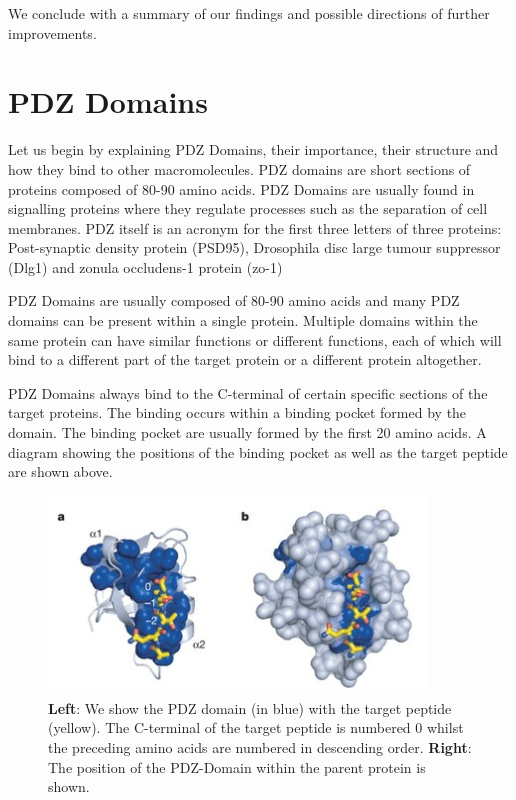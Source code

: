 \documentclass[a4paper, 12pt]{article}
\begin{document}
	We conclude with a summary of our findings and possible directions of further improvements. 

	\section{PDZ Domains}

	Let us begin by explaining PDZ Domains, their importance, their structure and how they bind to other macromolecules. PDZ domains are short sections of proteins composed of 80-90 amino acids. PDZ Domains are usually found in signalling proteins where they regulate processes such as the separation of cell membranes. PDZ itself is an acronym for the first three letters of three proteins: Post-synaptic density protein (PSD95), Drosophila disc large tumour suppressor (Dlg1) and zonula occludens-1 protein (zo-1)

	PDZ Domains are usually composed of 80-90 amino acids and many PDZ domains can be present within a single protein. Multiple domains within the same protein can have similar functions or different functions, each of which will bind to a different part of the target protein or a different protein altogether.

	PDZ Domains always bind to the C-terminal of certain specific sections of the target proteins. The binding occurs within a binding pocket formed by the domain. The binding pocket are usually formed by the first 20 amino acids. A diagram showing the positions of the binding pocket as well as the target peptide are shown above. 
	
	\begin{figure}
	\label{PDZ_Positions}
	\centering
	\includegraphics[width=10cm]{Images/pdz.jpg}
	\caption{\textbf{Left}: We show the PDZ domain (in blue) with the target peptide (yellow). The C-terminal of the target peptide is numbered 0 whilst the preceding amino acids are numbered in descending order. 
	\textbf{Right}: The position of the PDZ-Domain within the parent protein is shown.}
	\end{figure}	
\end{document}
